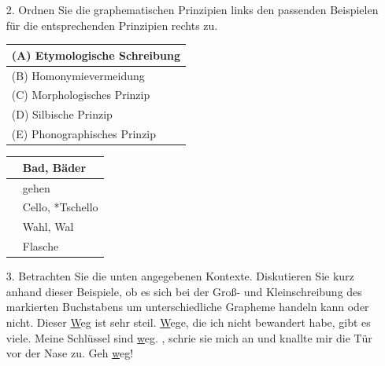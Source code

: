{%
\begin{frame}
	\begin{itemize}
		\item[2.] Ordnen Sie die graphematischen Prinzipien links den passenden Beispielen für die entsprechenden Prinzipien rechts zu.
		\begin{table}[h!]
			\begin{minipage}{0.45\textwidth}
				\centering
				\begin{tabular}{|l|}
					\hline
					(A) Etymologische Schreibung\\
					\hline
					(B) Homonymievermeidung\\
					\hline
					(C) Morphologisches Prinzip\\
					\hline
					(D) Silbische Prinzip\\
					\hline
					(E) Phonographisches Prinzip\\
					\hline
				\end{tabular}
			\end{minipage}\hfill%
			\begin{minipage}{0.45\textwidth}
				\centering
				\begin{tabular}{|p{}|l|}
					\hline
					& Bad, Bäder \\
					\hline
					& gehen \\
					\hline
					& Cello, *Tschello \\
					\hline
					& Wahl, Wal\\
					\hline
					& Flasche \\
					\hline
				\end{tabular}
			\end{minipage}
		\end{table}
	\end{itemize}
\end{frame}


\begin{frame}
	\begin{itemize}
		\item[3.] Betrachten Sie die unten angegebenen Kontexte. Diskutieren Sie kurz anhand dieser Beispiele, ob es sich bei der Groß- und Kleinschreibung des markierten Buchstabens um unterschiedliche Grapheme handeln kann oder nicht.
\eal
			\ex Dieser \underline{W}eg ist sehr steil.
			\ex \underline{W}ege, die ich nicht bewandert habe, gibt es viele.
			\ex Meine Schlüssel sind \underline{w}eg.
			\ex {}, schrie sie mich an und knallte mir die Tür vor der Nase zu.
			\ex Geh \underline{w}eg!
\zl
	\end{itemize}
\end{frame}


}
